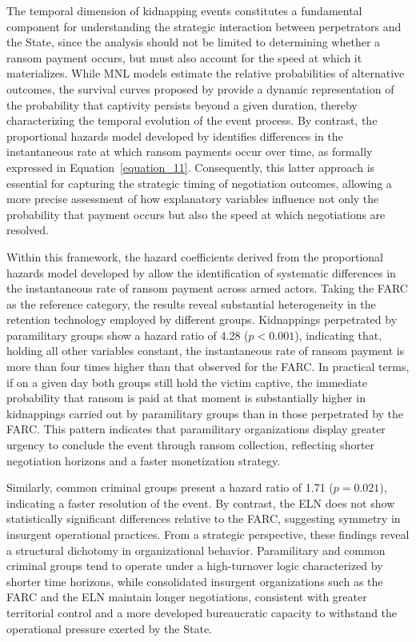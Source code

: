 \documentclass[12pt,a4paper]{article}
\providecommand{\textcite}{\citet}
\theoremstyle{plain}
\theoremstyle{definition}
\theoremstyle{remark}
\newcommand{\1}{\mathbf{1}}
\begin{document}
The temporal dimension of kidnapping events constitutes a fundamental component for understanding the strategic interaction between perpetrators and the State, since the analysis should not be limited to determining whether a ransom payment occurs, but must also account for the speed at which it materializes. While MNL models estimate the relative probabilities of alternative outcomes, the survival curves proposed by \textcite{Bradburn2003} provide a dynamic representation of the probability that captivity persists beyond a given duration, thereby characterizing the temporal evolution of the event process. By contrast, the proportional hazards model developed by \textcite{Cox1972} identifies differences in the instantaneous rate at which ransom payments occur over time, as formally expressed in Equation~\ref{equation_11}. Consequently, this latter approach is essential for capturing the strategic timing of negotiation outcomes, allowing a more precise assessment of how explanatory variables influence not only the probability that payment occurs but also the speed at which negotiations are resolved.

Within this framework, the hazard coefficients derived from the proportional hazards model developed by \textcite{Cox1972} allow the identification of systematic differences in the instantaneous rate of ransom payment across armed actors. Taking the FARC as the reference category, the results reveal substantial heterogeneity in the retention technology employed by different groups. Kidnappings perpetrated by paramilitary groups show a hazard ratio of 4.28 (\(p<0.001\)), indicating that, holding all other variables constant, the instantaneous rate of ransom payment is more than four times higher than that observed for the FARC. In practical terms, if on a given day both groups still hold the victim captive, the immediate probability that ransom is paid at that moment is substantially higher in kidnappings carried out by paramilitary groups than in those perpetrated by the FARC. This pattern indicates that paramilitary organizations display greater urgency to conclude the event through ransom collection, reflecting shorter negotiation horizons and a faster monetization strategy.

Similarly, common criminal groups present a hazard ratio of 1.71 (\(p=0.021\)), indicating a faster resolution of the event. By contrast, the ELN does not show statistically significant differences relative to the FARC, suggesting symmetry in insurgent operational practices. From a strategic perspective, these findings reveal a structural dichotomy in organizational behavior. Paramilitary and common criminal groups tend to operate under a high-turnover logic characterized by shorter time horizons, while consolidated insurgent organizations such as the FARC and the ELN maintain longer negotiations, consistent with greater territorial control and a more developed bureaucratic capacity to withstand the operational pressure exerted by the State.
\end{document}
